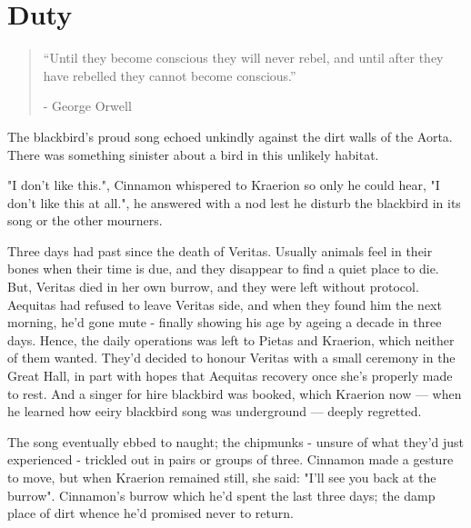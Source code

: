 \chapter{Duty}

\vspace{-1.3cm}
\begin{localsize}{10}
	\begin{quote}
        “Until they become conscious they will never rebel, and until after they have rebelled they cannot become conscious.”
		\begin{flushright}- George Orwell \end{flushright}
	\end{quote} 
\end{localsize}
\vspace{1cm}

The blackbird's proud song echoed unkindly against the dirt walls of the Aorta. There was something sinister about a bird in this unlikely habitat.

"I don't like this.", Cinnamon whispered to Kraerion so only he could hear, "I don't like this at all.", he answered with a nod lest he disturb the blackbird in its song or the other mourners.

Three days had past since the death of Veritas. Usually animals feel in their bones when their time is due, and they disappear to find a quiet place to die. But, Veritas died in her own burrow, and they were left without protocol. Aequitas had refused to leave Veritas side, and when they found him the next morning, he'd gone mute - finally showing his age by ageing a decade in three days. Hence, the daily operations was left to Pietas and Kraerion, which neither of them wanted. They'd decided to honour Veritas with a small ceremony in the Great Hall, in part with hopes that Aequitas recovery once she's properly made to rest. And a singer for hire blackbird was booked, which Kraerion now — when he learned how eeiry blackbird song was underground — deeply regretted.

The song eventually ebbed to naught; the chipmunks - unsure of what they'd just experienced - trickled out in pairs or groups of three. Cinnamon made a gesture to move, but when Kraerion remained still, she said: "I'll see you back at the burrow". Cinnamon's burrow which he'd spent the last three days; the damp place of dirt whence he'd promised never to return.

